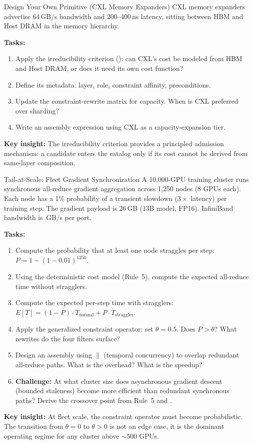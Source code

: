 \documentclass[10pt,twocolumn]{article}
\newcommand{\cvalint}[1]{\pgfmathprintnumber[fixed, precision=0, 1000 sep={\,}]{#1}}
\begin{document}
\begin{exercise}{Design Your Own Primitive (CXL Memory Expanders)}
CXL memory expanders advertise 64\,GB/s bandwidth and 200--400\,ns latency, sitting between HBM and Host DRAM in the memory hierarchy.

\textbf{Tasks:}
\begin{enumerate}[nosep, leftmargin=*]
\item Apply the irreducibility criterion (): can CXL's cost be modeled from HBM and Host DRAM, or does it need its own cost function?
\item Define its metadata: layer, role, constraint affinity, preconditions.
\item Update the constraint-rewrite matrix for capacity. When is CXL preferred over sharding?
\item Write an assembly expression using CXL as a capacity-expansion tier.
\end{enumerate}

\textbf{Key insight:} The irreducibility criterion provides a principled admission mechanism: a candidate enters the catalog only if its cost cannot be derived from same-layer composition.
\end{exercise}

\begin{exercise}{Tail-at-Scale: Fleet Gradient Synchronization}
A 10,000-GPU training cluster runs synchronous all-reduce gradient aggregation across 1,250 nodes (8 GPUs each). Each node has a 1\% probability of a transient slowdown ($3\times$ latency) per training step. The gradient payload is 26\,GB (13B model, FP16). InfiniBand bandwidth is \cvalint{\IBBWGBs}\,GB/s per port.

\textbf{Tasks:}
\begin{enumerate}[nosep, leftmargin=*]
\item Compute the probability that at least one node straggles per step: $P = 1 - (1 - 0.01)^{1250}$.
\item Using the deterministic cost model (Rule~5), compute the expected all-reduce time without stragglers.
\item Compute the expected per-step time with stragglers: $E[T] = (1{-}P) \cdot T_{\text{normal}} + P \cdot T_{\text{straggler}}$.
\item Apply the generalized constraint operator: set $\theta = 0.5$. Does $P > \theta$? What rewrites do the four filters surface?
\item Design an assembly using $\parallel$ (temporal concurrency) to overlap redundant all-reduce paths. What is the overhead? What is the speedup?
\item \textbf{Challenge:} At what cluster size does asynchronous gradient descent (bounded staleness) become more efficient than redundant synchronous paths? Derive the crossover point from Rule~5 and .
\end{enumerate}

\textbf{Key insight:} At fleet scale, the constraint operator must become probabilistic. The transition from $\theta = 0$ to $\theta > 0$ is not an edge case, it is the dominant operating regime for any cluster above ${\sim}$500 GPUs.
\end{exercise}
\end{document}
